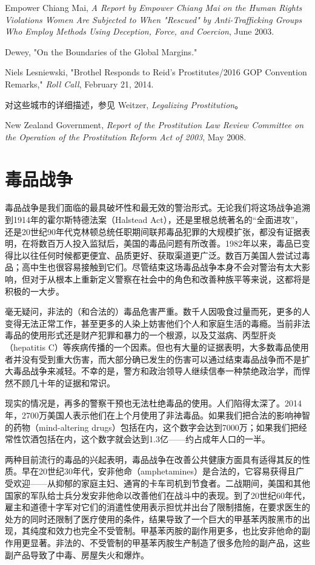 \documentclass[fontset=fandol, a4paper, 12pt, openright]{ctexbook}
\begin{document}
\begin{enumerate}[label={[\arabic*]}]
    \item Empower Chiang Mai, \textit{A Report by Empower Chiang Mai on the Human Rights Violations Women Are Subjected to When "Rescued" by Anti-Trafficking Groups Who Employ Methods Using Deception, Force, and Coercion}, June 2003.
    \item Dewey, "On the Boundaries of the Global Margins."
    \item Niels Lesniewski, "Brothel Responds to Reid's Prostitutes/2016 GOP Convention Remarks," \textit{Roll Call}, February 21, 2014.
    \item 对这些城市的详细描述，参见 Weitzer, \textit{Legalizing Prostitution}。
    \item New Zealand Government, \textit{Report of the Prostitution Law Review Committee on the Operation of the Prostitution Reform Act of 2003}, May 2008.
\end{enumerate}

\chapter{毒品战争}

毒品战争是我们面临的最具破坏性和最无效的警治形式。无论我们将这场战争追溯到1914年的霍尔斯特德法案（Halstead Act），还是里根总统著名的“全面进攻”，还是20世纪90年代克林顿总统任职期间联邦毒品犯罪的大规模扩张，都没有证据表明，在将数百万人投入监狱后，美国的毒品问题有所改善。1982年以来，毒品已变得比以往任何时候都更便宜、品质更好、获取渠道更广泛。数百万美国人尝试过毒品；高中生也很容易接触到它们。尽管结束这场毒品战争本身不会对警治有太大影响，但对于从根本上重新定义警察在社会中的角色和改善种族平等来说，这都将是积极的一大步。

毫无疑问，非法的（和合法的）毒品危害严重。数千人因吸食过量而死，更多的人变得无法正常工作，甚至更多的人染上妨害他们个人和家庭生活的毒瘾。当前非法毒品的使用形式还是财产犯罪和暴力的一个根源，以及艾滋病、丙型肝炎（hepatitis C）等疾病传播的一个因素。但也有大量的证据表明，大多数毒品使用者并没有受到重大伤害，而大部分确已发生的伤害可以通过结束毒品战争而不是扩大毒品战争来减轻。不幸的是，警方和政治领导人继续信奉一种禁绝政治学，而悍然不顾几十年的证据和常识。

现实的情况是，再多的警察干预也无法杜绝毒品的使用。人们陷得太深了。2014年，2700万美国人表示他们在上个月使用了非法毒品。如果我们把合法的影响神智的药物（mind-altering drugs）包括在内，这个数字会达到7000万；如果我们把经常性饮酒包括在内，这个数字就会达到1.3亿——约占成年人口的一半。

两种目前流行的毒品的兴起表明，毒品战争在改善公共健康方面具有适得其反的性质。早在20世纪30年代，安非他命（amphetamines）是合法的，它容易获得且广受欢迎——从抑郁的家庭主妇、通宵的卡车司机到节食者。二战期间，美国和其他国家的军队给士兵分发安非他命以改善他们在战斗中的表现。到了20世纪60年代，雇主和道德十字军对它们的消遣性使用表示担忧并出台了限制措施，在要求医生的处方的同时还限制了医疗使用的条件，结果导致了一个巨大的甲基苯丙胺黑市的出现，其纯度和效力也完全不受管制。甲基苯丙胺的副作用更多，也比安非他命的副作用更显著。非法的、不受管制的甲基苯丙胺生产制造了很多危险的副产品，这些副产品导致了中毒、房屋失火和爆炸。
\end{document}
